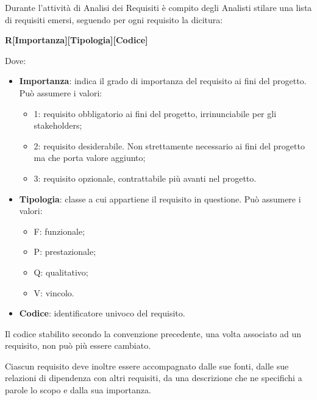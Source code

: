                 	Durante l'attività di Analisi dei Requisiti è compito degli Analisti stilare una lista di requisiti emersi, seguendo per ogni requisito la dicitura:
                    \begin{center}
                    \textbf{R[Importanza][Tipologia][Codice]}
                    \end{center}
                    
                    Dove:
                    \begin{itemize}
                        	\item{\textbf{Importanza}: indica il grado di importanza del requisito ai fini del progetto. Può assumere i valori:}
                        	\begin{itemize}
                                	\item{1: requisito obbligatorio ai fini del progetto, irrinunciabile per gli stakeholders;}
                                	\item{2: requisito desiderabile. Non strettamente necessario ai fini del progetto ma che porta valore aggiunto;}
                                	\item{3: requisito opzionale, contrattabile più avanti nel progetto.}
                        	\end{itemize}
                        	\item{\textbf{Tipologia}: classe a cui appartiene il requisito in questione. Può assumere i valori:}
                        	\begin{itemize}
                        		\item{F: funzionale;}
                        		\item{P: prestazionale;}
                        		\item{Q: qualitativo;}
                        		\item{V: vincolo.}
                        	\end{itemize}
                        	\item{\textbf{Codice}: identificatore univoco del requisito}.
                    \end{itemize}
                    
                    Il codice stabilito secondo la convenzione precedente, una volta associato ad un requisito, non può più essere cambiato.
                    
                    Ciascun requisito deve inoltre essere accompagnato dalle sue fonti, dalle sue relazioni di dipendenza con altri requisiti, da una descrizione che ne specifichi a parole lo scopo e dalla sua importanza.
                    
